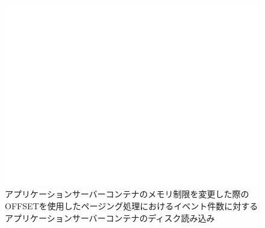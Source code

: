 \documentclass[../../../../../main]{subfiles}
\begin{document}
    \begin{figure}[H]
        \centering
        \includegraphics[width=12cm]{graph}
        \caption{アプリケーションサーバーコンテナのメモリ制限を変更した際のOFFSETを使用したページング処理におけるイベント件数に対するアプリケーションサーバーコンテナのディスク読み込み}
        \label{fig:paging-offset-change-app-memory-limit-app-disk-out-app_4_db_1_1024}
    \end{figure}
\end{document}

